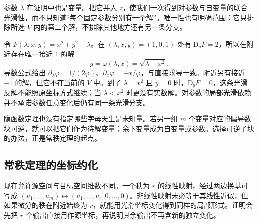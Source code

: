 参数 \(\lambda\) 在证明中也是变量。把它并入 \(z\)，使我们一次得到对参数与自变量的联合光滑性，而不只知道“每个固定参数分别有一个解”。唯一性也有明确范围：它只排除所选 \(V\) 内的第二个解，不排除其他地方还有另一条分支。

\begin{example}
	\label{g1:exm:parameter-circle-implicit}
	令 \(F(\lambda,x,y)=x^2+y^2-\lambda\)。在 \((\lambda,x,y)=(1,0,1)\) 处有 \(\mathrm{D}_yF=2\)，所以在附近存在唯一接近 \(1\) 的解
	\[
		y=\varphi(\lambda,x)=\sqrt{\lambda-x^2}.
	\]
	导数公式给出 \(\partial_\lambda\varphi=1/(2\varphi)\)、\(\partial_x\varphi=-x/\varphi\)，与直接求导一致。附近另有接近 \(-1\) 的解，但它不在当前的 \(V\) 中。到了 \(\lambda=x^2\) 且 \(y=0\) 时，\(\mathrm{D}_yF=0\)，这条光滑反解不能照原坐标方式继续；当 \(\lambda<x^2\) 时更没有实数解。对参数的局部光滑依赖并不承诺参数任意变化后仍有同一条光滑分支。
\end{example}

隐函数定理也没有指定哪些字母天生是未知量。若另一组 \(m\) 个变量对应的偏导数块可逆，就可以把它们作为待解变量；余下变量成为自变量或参数。选择可逆子块的办法，正是常秩定理的起点。

\subsection{常秩定理的坐标约化}
\label{g1:subsec:1103:03}

现在允许源空间与目标空间维数不同。一个秩为 \(r\) 的线性映射，经过两边换基可写成 \((u_1,\ldots,u_m)\mapsto(u_1,\ldots,u_r,0,\ldots,0)\)。非线性映射未必等于其线性近似，但如果微分的秩在附近始终为 \(r\)，就能用光滑坐标变化得到同样的局部形式。证明会先把 \(r\) 个输出直接用作源坐标，再说明其余输出不再含新的独立变化。

